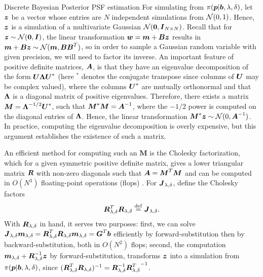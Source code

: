 \begin{chapter}{Discrete Bayesian Posterior PSF estimation}
For simulating from $\pi(\mbox{\boldmath$p$}|\mbox{\boldmath$b$}, \lambda,\delta)$, let $\mbox{\boldmath$z$}$ be a vector whose entries are $N$ independent simulations from $\mathcal{N}(0,1)$. 
Hence, $\mbox{\boldmath$z$}$ is a simulation of a multivariate Gaussian $\mathcal{N}(\mbox{\boldmath$0$},\mbox{\boldmath$I$}_{N\times N})$.
Recall that for $\mbox{\boldmath$z$} \sim \mathcal{N}(\mbox{\boldmath$0$},\mbox{\boldmath$I$})$, the linear transformation $\mbox{\boldmath$w$} = \mbox{\boldmath$m$} + \mbox{\boldmath$B$}\mbox{\boldmath$z$}$ results in $\mbox{\boldmath$m$} + \mbox{\boldmath$B$} \mbox{\boldmath$z$} \sim \mathcal{N}(\mbox{\boldmath$m$}, \mbox{\boldmath$B$}\mbox{\boldmath$B$}^T)$, so in order to sample a Gaussian random variable with given precision, we will need to factor its inverse.
An important feature of positive definite matrices, $\mbox{\boldmath$A$}$, is that they have an eigenvalue decomposition of the form $\mbox{\boldmath$U$} \mbox{\boldmath$\Lambda$} \mbox{\boldmath$U$}^*$ (here $^*$ denotes the conjugate transpose since columns of $\mbox{\boldmath$U$}$ may be complex valued), where the columns $\mbox{\boldmath$U$}^*$ are mutually orthonormal and that $\mbox{\boldmath$\Lambda$}$ is a diagonal matrix of positive eigenvalues.
Therefore, there exists a matrix $\mbox{\boldmath$M$} =  \mbox{\boldmath$\Lambda$}^{-1/2} \mbox{\boldmath$U$}^*$, such that $\mbox{\boldmath$M$}^*\mbox{\boldmath$M$} = \mbox{\boldmath$A$}^{-1}$, where the $-1/2$ power is computed on the diagonal entries of $\mbox{\boldmath$\Lambda$}$.
Hence, the linear transformation $\mbox{\boldmath$M$}^* \mbox{\boldmath$z$} \sim \mathcal{N}(0,\mbox{\boldmath$A$}^{-1})$.  
In practice, computing the eigenvalue decomposition is overly expensive, but this argument establishes the existence of such a matrix.

An efficient method for computing such an $\bm M$ is the Cholesky factorization, which for a given symmetric positive definite matrix, gives a lower triangular matrix $\mbox{\boldmath$R$}$ with non-zero diagonals such that $\mbox{\boldmath$A$} = \mbox{\boldmath$M$}^T\mbox{\boldmath$M$}$ and can be computed in $O(N^3)$ floating-point operations (flops) \citep{golub2012matrix}.
For $\mbox{\boldmath$J$}_{\lambda,\delta}$, define the Cholesky factors
\begin{equation} \label{eq:choleskyJ}
  \mbox{\boldmath$R$}_{\lambda,\delta}^T\mbox{\boldmath$R$}_{\lambda,\delta} \stackrel{\rm def}{=} \mbox{\boldmath$J$}_{\lambda,\delta}.
\end{equation}
With $\mbox{\boldmath$R$}_{\lambda,\delta}$ in hand, it serves two purposes: first, we can solve $\mbox{\boldmath$J$}_{\lambda,\delta} \mbox{\boldmath$m$}_{\lambda,\delta} = \mbox{\boldmath$R$}_{\lambda,\delta}^T\mbox{\boldmath$R$}_{\lambda,\delta} \mbox{\boldmath$m$}_{\lambda,\delta} = \mbox{\boldmath$G$}^T \mbox{\boldmath$b$}$ efficiently by forward-substitution then by backward-substitution, both in $O(N^2)$ flops; second, the computation $\mbox{\boldmath$m$}_{\lambda,\delta} + \mbox{\boldmath$R$}_{\lambda,\delta}^{-1} \mbox{\boldmath$z$}$ by forward-substitution, transforms $\mbox{\boldmath$z$}$ into a simulation from $\pi(\mbox{\boldmath$p$} | \mbox{\boldmath$b$},\lambda,\delta)$,
since $(\mbox{\boldmath$R$}_{\lambda,\delta}^T \mbox{\boldmath$R$}_{\lambda,\delta})^{-1} =\mbox{\boldmath$R$}_{\lambda,\delta}^{-1} {\mbox{\boldmath$R$}_{\lambda,\delta}^T}^{-1}$.


\end{chapter}
